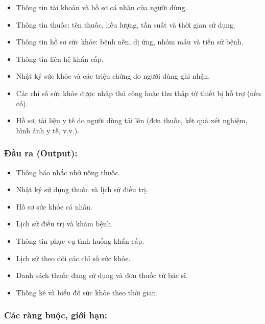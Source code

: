 \documentclass[12pt,a4paper]{report}
\begin{document}
\begin{itemize}[leftmargin=1.5em, itemsep=2pt]
    \item Thông tin tài khoản và hồ sơ cá nhân của người dùng.
    \item Thông tin thuốc: tên thuốc, liều lượng, tần suất và thời gian sử dụng.
    \item Thông tin hồ sơ sức khỏe: bệnh nền, dị ứng, nhóm máu và tiền sử bệnh.
    \item Thông tin liên hệ khẩn cấp.
    \item Nhật ký sức khỏe và các triệu chứng do người dùng ghi nhận.
    \item Các chỉ số sức khỏe được nhập thủ công hoặc thu thập từ thiết bị hỗ trợ (nếu có).
    \item Hồ sơ, tài liệu y tế do người dùng tải lên (đơn thuốc, kết quả xét nghiệm, hình ảnh y tế, v.v.).
\end{itemize}

\subsubsection{Đầu ra (Output):}

\begin{itemize}[leftmargin=1.5em, itemsep=2pt]
  \item Thông báo nhắc nhở uống thuốc.
  \item Nhật ký sử dụng thuốc và lịch sử điều trị.
  \item Hồ sơ sức khỏe cá nhân.
  \item Lịch sử điều trị và khám bệnh.
  \item Thông tin phục vụ tình huống khẩn cấp.
  \item Lịch sử theo dõi các chỉ số sức khỏe.
  \item Danh sách thuốc đang sử dụng và đơn thuốc từ bác sĩ.
  \item Thống kê và biểu đồ sức khỏe theo thời gian.
\end{itemize}

\subsubsection{Các ràng buộc, giới hạn:} 
\end{document}
